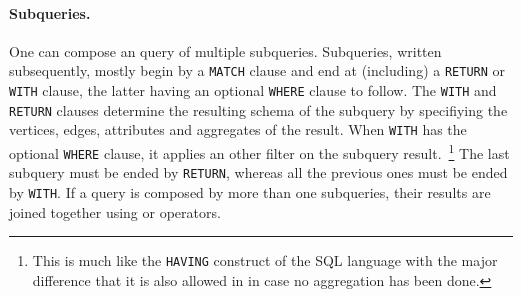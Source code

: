 \paragraph{Subqueries.} One can compose an \opencypher query of multiple subqueries. Subqueries, written subsequently, mostly begin by a \lstinline+MATCH+ clause and end at (including) a \lstinline+RETURN+ or \lstinline+WITH+ clause, the latter having an optional \lstinline+WHERE+ clause to follow. The \lstinline+WITH+ and \lstinline+RETURN+ clauses determine the resulting schema of the subquery by specifiying the vertices, edges, attributes and aggregates of the result. When \lstinline+WITH+ has the optional \lstinline+WHERE+ clause, it applies an other filter on the subquery result.~\footnote{This is much like the \lstinline+HAVING+ construct of the SQL language with the major difference that it is also allowed in \opencypher in case no aggregation has been done.} The last subquery must be ended by \lstinline+RETURN+, whereas all the previous ones must be ended by \lstinline+WITH+. If a query is composed by more than one subqueries, their results are joined together using \jointext or \leftouterjointext operators.
